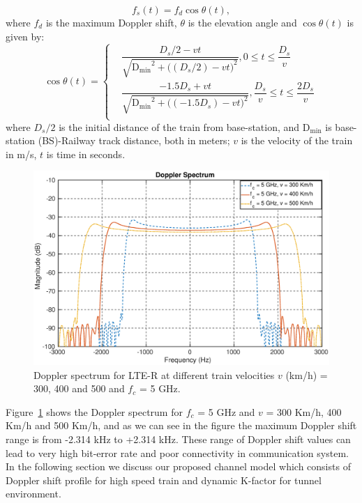 \begin{equation}
\label{eq1}
f_s(t) = f_d\cos\theta(t),
\end{equation}
where \textrm{$f_d$} is the maximum Doppler shift, $\theta$ is the elevation angle and $\cos \theta(t)$ is given by:
\begin{equation}
\cos\theta(t) = 
\left\{
	\begin{aligned}
	 & \dfrac{D_s/2-vt}{\sqrt{\mathrm{D_{min}}^2+\bigg((D_s/2)-vt\bigg)^2}},0\leq t\leq\dfrac{D_s}{v}\\
	 & \dfrac{-1.5D_s+vt}{\sqrt{\mathrm{D_{min}}^2+\bigg((-1.5D_s)-vt\bigg)^2}},\dfrac{D_s}{v}\leq t \leq \dfrac{2D_s}{v}\\
 	\end{aligned}
\right.
\end{equation}
where $D_s/2$ is the initial distance of the train from base-station, and $\mathrm{D_{min}}$ is base-station (BS)-Railway track distance, both in meters; $v$ is the velocity of the train in \textrm{m/s}, $t$ is time in seconds.

\begin{figure}[!ht]
\label{doppler}
\centering
\includegraphics[width=\textwidth,keepaspectratio]{images/Gill/lte_figs/dopplerspectrum.eps} 
\caption{Doppler spectrum for LTE-R at different train velocities $v$ (km/h) = 300, 400 and 500 and $f_c$ = 5 GHz.}
\end{figure}

Figure~\ref{doppler} shows the Doppler spectrum for $f_c$ = 5 GHz and $v$ = 300 Km/h, 400 Km/h and 500 Km/h, and as we can see in the figure the maximum Doppler shift range is from -2.314 kHz to +2.314 kHz. These range of Doppler shift values can lead to very high bit-error rate and poor connectivity in communication system. In the following section we discuss our proposed channel model which consists of Doppler shift profile for high speed train and dynamic K-factor for tunnel environment.

